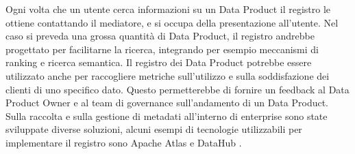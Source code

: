 \documentclass[a4paper,12pt]{report}
\begin{document}
Ogni volta che un utente cerca informazioni su un Data Product il registro le ottiene contattando il mediatore, e si occupa della presentazione all'utente.
Nel caso si preveda una grossa quantità di Data Product, il registro andrebbe progettato per facilitarne la ricerca, integrando per esempio meccanismi di ranking e ricerca semantica.
Il registro dei Data Product potrebbe essere utilizzato anche per raccogliere metriche sull'utilizzo e sulla soddisfazione dei clienti di uno specifico dato.
Questo permetterebbe di fornire un feedback al Data Product Owner e al team di governance sull'andamento di un Data Product.
Sulla raccolta e sulla gestione di metadati all'interno di enterprise sono state sviluppate diverse soluzioni, alcuni esempi di tecnologie utilizzabili per implementare il registro sono Apache Atlas e DataHub \cite{dataHub, atlas_docs}.
\end{document}
